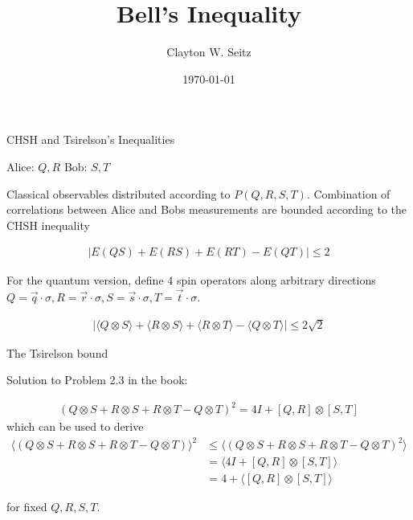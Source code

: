 \documentclass[aspectratio=1610]{beamer}					%
\title{Bell's Inequality}	%
\author{Clayton W. Seitz}								%
\date{\today}									%
\begin{document}
\begin{frame}
  \titlepage
\end{frame}

\begin{frame}{CHSH and Tsirelson's Inequalities}

\vspace{0.2in}

Alice: $Q,R$
Bob: $S, T$

\vspace{0.1in}
Classical observables distributed according to $P(Q,R,S,T)$. Combination of correlations between Alice and Bobs measurements are bounded according to the CHSH inequality

\begin{align*}
|E(QS) + E(RS) + E(RT) - E(QT)| \leq 2
\end{align*}

For the quantum version, define 4 spin operators along arbitrary directions $Q = \vec{q}\cdot\sigma, R = \vec{r}\cdot\sigma, S = \vec{s}\cdot\sigma, T = \vec{t}\cdot\sigma$.

\begin{align*}
|\langle Q\otimes S\rangle + \langle R\otimes S\rangle  + \langle R\otimes T\rangle  - \langle Q\otimes T\rangle|  \leq 2\sqrt{2}
\end{align*}



\end{frame}

\begin{frame}{The Tsirelson bound}

Solution to Problem 2.3 in the book:

\begin{align*}
(Q\otimes S + R\otimes S  + R\otimes T  - Q\otimes T)^{2} = 4I + [Q,R]\otimes [S,T]
\end{align*}
which can be used to derive
\begin{align*}
\langle(Q\otimes S + R\otimes S  + R\otimes T  - Q\otimes T)\rangle^{2} &\leq \langle(Q\otimes S + R\otimes S  + R\otimes T  - Q\otimes T)^{2}\rangle \\
&= \langle 4I + [Q,R]\otimes [S,T]\rangle \\
&= 4 + \langle [Q,R]\otimes [S,T]\rangle
\end{align*}

for fixed $Q,R,S,T$.

\end{frame}
\end{document}
